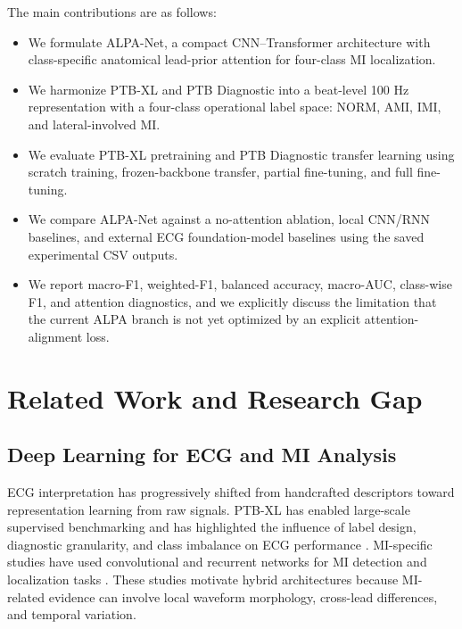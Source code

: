 \documentclass[a4paper,fleqn]{cas-dc}
\begin{document}
The main contributions are as follows:
\begin{itemize}
  \item We formulate ALPA-Net, a compact CNN--Transformer architecture with class-specific anatomical lead-prior attention for four-class MI localization.
  \item We harmonize PTB-XL and PTB Diagnostic into a beat-level 100 Hz representation with a four-class operational label space: NORM, AMI, IMI, and lateral-involved MI.
  \item We evaluate PTB-XL pretraining and PTB Diagnostic transfer learning using scratch training, frozen-backbone transfer, partial fine-tuning, and full fine-tuning.
  \item We compare ALPA-Net against a no-attention ablation, local CNN/RNN baselines, and external ECG foundation-model baselines using the saved experimental CSV outputs.
  \item We report macro-F1, weighted-F1, balanced accuracy, macro-AUC, class-wise F1, and attention diagnostics, and we explicitly discuss the limitation that the current ALPA branch is not yet optimized by an explicit attention-alignment loss.
\end{itemize}

\section{Related Work and Research Gap}
\subsection{Deep Learning for ECG and MI Analysis}
ECG interpretation has progressively shifted from handcrafted descriptors toward representation
learning from raw signals. PTB-XL has enabled large-scale supervised benchmarking and has
highlighted the influence of label design, diagnostic granularity, and class imbalance on ECG
performance
\cite{Wagner2020SciData_PTBXL,StrodthoffWagnerSchaeffterSamek2021JBHI_PTBXL_Benchmarks,PalczynskiSmigielLedzinskiBujnowski2022Sensors_FewShot_PTBXL,SmigielPalczynskiLedzinski2021Entropy_DL_PTBXL}.
MI-specific studies have used convolutional and recurrent networks for MI detection and localization
tasks
\cite{Gustafsson2022SciRep_MI_ED,Pham2023Sensors_Heartbeat_ArrMI,FengPiLiuSun2019ApplSci_MI_CNN_RNN,LuiChow2019IMU_MI_CNN_RNN_Portable,Hasbullah2023BioMedInformatics_MI_Hybrid_CNN_RNN}.
These studies motivate hybrid architectures because MI-related evidence can involve local waveform
morphology, cross-lead differences, and temporal variation.
\end{document}
